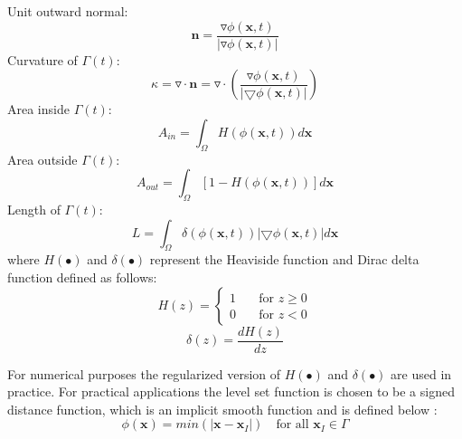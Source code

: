 \documentclass[10pt,letterpaper, onecolumn]{article}
\begin{document}
\noindent Unit outward normal:
%
\begin{equation}
\bm{n} = \frac{\triangledown \phi(\bm{x},t)}{\left\vert \triangledown \phi(\bm{x},t) \right\vert}
\label{eqn:3.2}
\end{equation}
%
Curvature of $\Gamma(t)$:
%
\begin{equation}
\kappa = \triangledown \cdot \bm{n} = \triangledown \cdot \left(  \frac{\triangledown \phi(\bm{x},t)}{\left\vert \bigtriangledown \phi(\bm{x},t) \right\vert} \right)
\end{equation}
%
Area inside $\Gamma(t)$:
%
\begin{equation}
A_{in} = \int_{\Omega} H(\phi(\bm{x},t)) d\bm{x}
\end{equation}
%
Area outside $\Gamma(t)$:
%
\begin{equation}
A_{out} = \int_{\Omega} [1 - H(\phi(\bm{x},t))] d\bm{x}
\end{equation}
%
Length of $\Gamma(t)$:
%
\begin{equation}
L = \int_{\Omega} \delta(\phi(\bm{x},t))
 \left\vert \bigtriangledown \phi(\bm{x},t) \right\vert  d\bm{x}
\end{equation}
%
where $H(\bullet)$ and $\delta(\bullet)$ represent the Heaviside function and Dirac delta 
function defined as follows:
%
\begin{equation}
H(z)=
\begin{cases}
1 \quad       &\text{for } z\geq0   \\
0 \quad       &\text{for } z <0
\end{cases} 
\end{equation}
%
%
\begin{equation}
\delta(z)  = \frac{dH(z)}{dz}
\end{equation}
%

For numerical purposes the regularized version of $H(\bullet)$ and $\delta(\bullet)$ are used in practice. For practical applications the level set function is chosen to be a signed distance function, which is an implicit smooth function and is defined below \cite{osherbook2003level}:
%
\begin{equation}
\phi(\bm{x}) = min(\vert \bm{x} - \bm{x}_I \vert)  \quad \text{for all }  \bm{x}_I  \in \Gamma
\end{equation}
%
\end{document}
